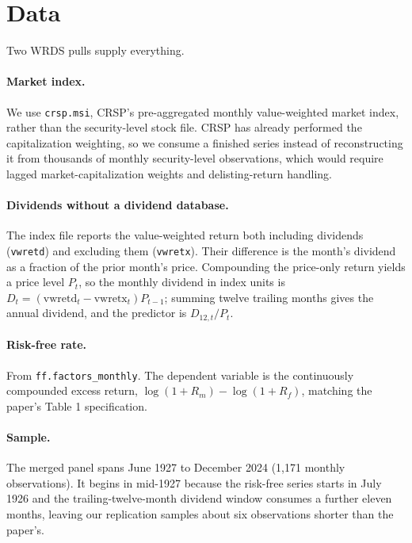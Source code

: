 \documentclass[11pt]{article}
\begin{document}
\section{Data}

Two WRDS pulls supply everything.

\paragraph{Market index.} We use \texttt{crsp.msi}, CRSP's pre-aggregated
monthly value-weighted market index, rather than the security-level stock file.
CRSP has already performed the capitalization weighting, so we consume a
finished series instead of reconstructing it from thousands of monthly
security-level observations, which would require lagged market-capitalization
weights and delisting-return handling.

\paragraph{Dividends without a dividend database.} The index file reports the
value-weighted return both including dividends (\texttt{vwretd}) and excluding
them (\texttt{vwretx}). Their difference is the month's dividend as a fraction
of the prior month's price. Compounding the price-only return yields a price
level $P_t$, so the monthly dividend in index units is
$D_t = (\text{vwretd}_t - \text{vwretx}_t) P_{t-1}$; summing twelve trailing
months gives the annual dividend, and the predictor is $D_{12,t}/P_t$.

\paragraph{Risk-free rate.} From \texttt{ff.factors\_monthly}. The dependent
variable is the continuously compounded excess return,
$\log(1+R_m) - \log(1+R_f)$, matching the paper's Table 1 specification.

\paragraph{Sample.} The merged panel spans June 1927 to December 2024
(1{,}171 monthly observations). It begins in mid-1927 because the risk-free
series starts in July 1926 and the trailing-twelve-month dividend window
consumes a further eleven months, leaving our replication samples about six
observations shorter than the paper's.
\end{document}
